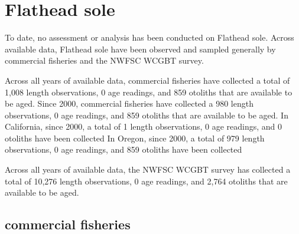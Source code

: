 \documentclass[11pt,
  english,
  letterpaper,
]{article}
\begin{document}

\hypertarget{flathead-sole}{%
\section{Flathead sole}\label{flathead-sole}}

\leavevmode\tagmcend\tagstructend


To date, no assessment or analysis has been conducted on Flathead sole. Across available data, Flathead sole have been observed and sampled generally by commercial fisheries and the NWFSC WCGBT survey.

\leavevmode\tagmcend\tagstructend\par


Across all years of available data, commercial fisheries have collected a total of 1,008 length observations, 0 age readings, and 859 otoliths that are available to be aged. Since 2000, commercial fisheries have collected a 980 length observations, 0 age readings, and 859 otoliths that are available to be aged. In California, since 2000, a total of 1 length observations, 0 age readings, and 0 otoliths have been collected In Oregon, since 2000, a total of 979 length observations, 0 age readings, and 859 otoliths have been collected

\leavevmode\tagmcend\tagstructend\par


Across all years of available data, the NWFSC WCGBT survey has collected a total of 10,276 length observations, 0 age readings, and 2,764 otoliths that are available to be aged.

\leavevmode\tagmcend\tagstructend\par


\hypertarget{commercial-fisheries-21}{%
\subsection{commercial fisheries}\label{commercial-fisheries-21}}

\leavevmode\tagmcend\tagstructend

\end{document}

